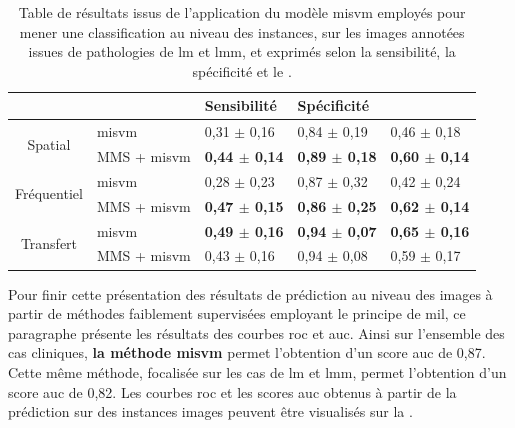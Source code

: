\begin{table}[H]
    \centering
    \begin{tabular}{cllll}
        \toprule
        \multicolumn{1}{l}{}         &                      & Sensibilité               & Spécificité               & \Fscore{}                 \\ \midrule
        \multirow{2}{*}{Spatial}     & \gls{misvm}          & 0,31 $\pm$ 0,16             & 0,84 $\pm$ 0,19             & 0,46 $\pm$ 0,18             \\
                                     & MMS + \gls{misvm}    & \textbf{0,44 $\pm$ 0,14}    & \textbf{0,89 $\pm$ 0,18}    & \textbf{0,60 $\pm$ 0,14}    \\ \midrule
        \multirow{2}{*}{Fréquentiel} & \gls{misvm}          & 0,28 $\pm$ 0,23             & 0,87 $\pm$ 0,32             & 0,42 $\pm$ 0,24             \\
                                     & MMS + \gls{misvm}    & \textbf{0,47 $\pm$ 0,15}    & \textbf{0,86 $\pm$ 0,25}    & \textbf{0,62 $\pm$ 0,14}    \\ \midrule
        \multirow{2}{*}{Transfert}   & \gls{misvm}          & \textbf{0,49 $\pm$ 0,16}    & \textbf{0,94 $\pm$ 0,07}    & \textbf{0,65 $\pm$ 0,16}    \\
                                     & MMS + \gls{misvm}    & 0,43 $\pm$ 0,16             & 0,94 $\pm$ 0,08             & 0,59 $\pm$ 0,17             \\ \bottomrule
    \end{tabular}
    \caption{Table de résultats issus de l'application du modèle \gls{misvm} employés pour mener une classification au niveau des instances, sur les images annotées issues de pathologies de \gls{lm} et \gls{lmm}, et exprimés selon la sensibilité, la spécificité et le \fscore{}.}
    \label{tab:results_lesion_classification_weakly_image_lm}
\end{table}

Pour finir cette présentation des résultats de prédiction au niveau des images à partir de méthodes faiblement supervisées employant le principe de \gls{mil}, ce paragraphe présente les résultats des courbes \gls{roc} et \gls{auc}. Ainsi sur l'ensemble des cas cliniques, \textbf{la méthode \gls{misvm}} permet l'obtention d'un score \gls{auc} de 0,87. Cette même méthode, focalisée sur les cas de \gls{lm} et \gls{lmm}, permet l'obtention d'un score \gls{auc} de 0,82. Les courbes \gls{roc} et les scores \gls{auc} obtenus à partir de la prédiction sur des instances images peuvent être visualisés sur la .\par

